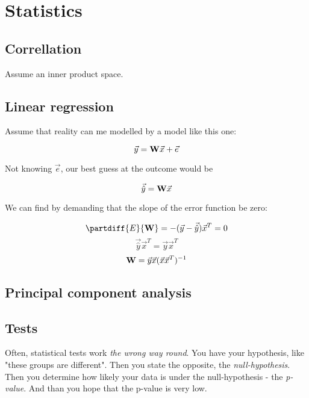 \section{Statistics}

\subsection{Correllation}
Assume an inner product space.

\subsection{Linear regression}

Assume that reality can me modelled by a model like this one: 

$$ \vec{y} = \mathbf{W} \vec{x} + \vec{e} $$

Not knowing $\vec{e}$, our best guess at the outcome would be 

$$ \vec{\hat{y}} = \mathbf{W} \vec{x} $$

We can find  by demanding that the slope of the error function be zero: 

$$ \partdiff{E}{\mtrx{W}} = -  (\vec{y} - \vec{\hat{y}}) \vec{x}^T = 0 $$
$$ \vec{\hat{y}} \vec{x}^T = \vec{y} \vec{x}^T $$
$$ \mathbf{W} = \vec{y} \vec{x} (\vec{x} \vec{x}^T)^{-1} $$


\subsection{Principal component analysis}


\subsection{Tests}
Often, statistical tests work \emph{the wrong way round}. You have your hypothesis, like "these groups are different". Then you state the opposite, the \emph{null-hypothesis}. Then you determine how likely your data is under the null-hypothesis - the \emph{p-value}. And than you hope that the p-value is very low.

